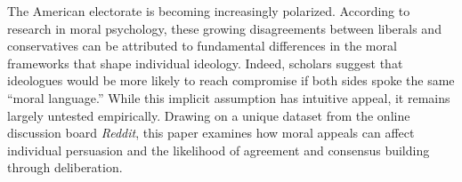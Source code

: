 The American electorate is becoming increasingly polarized. According to research in moral psychology, these growing disagreements between liberals and conservatives can be attributed to fundamental differences in the moral frameworks that shape individual ideology. Indeed, scholars suggest that ideologues would be more likely to reach compromise if both sides spoke the same ``moral language.'' While this implicit assumption has intuitive appeal, it remains largely untested empirically. Drawing on a unique dataset from the online discussion board \emph{Reddit}, this paper examines how moral appeals can affect individual persuasion and the likelihood of agreement and consensus building through deliberation.